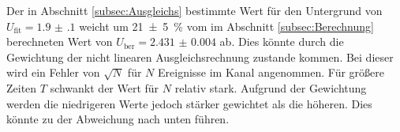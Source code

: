 Der in Abschnitt \ref{subsec:Ausgleichs} bestimmte Wert für den Untergrund von $U_\text{fit}=\num{1.9(1)}$ weicht um \SI{21(5)}{\percent} vom im Abschnitt \ref{subsec:Berechnung} berechneten Wert von $U_\text{ber}=\num{2.431(4)}$ ab. Dies könnte durch die Gewichtung der nicht linearen Ausgleichsrechnung zustande kommen. Bei dieser wird ein Fehler von $\sqrt{N}$ für $N$ Ereignisse im Kanal angenommen. Für größere Zeiten $T$ schwankt der Wert für $N$ relativ stark. Aufgrund der Gewichtung werden die niedrigeren Werte jedoch stärker gewichtet als die höheren. Dies könnte zu der Abweichung nach unten führen.




